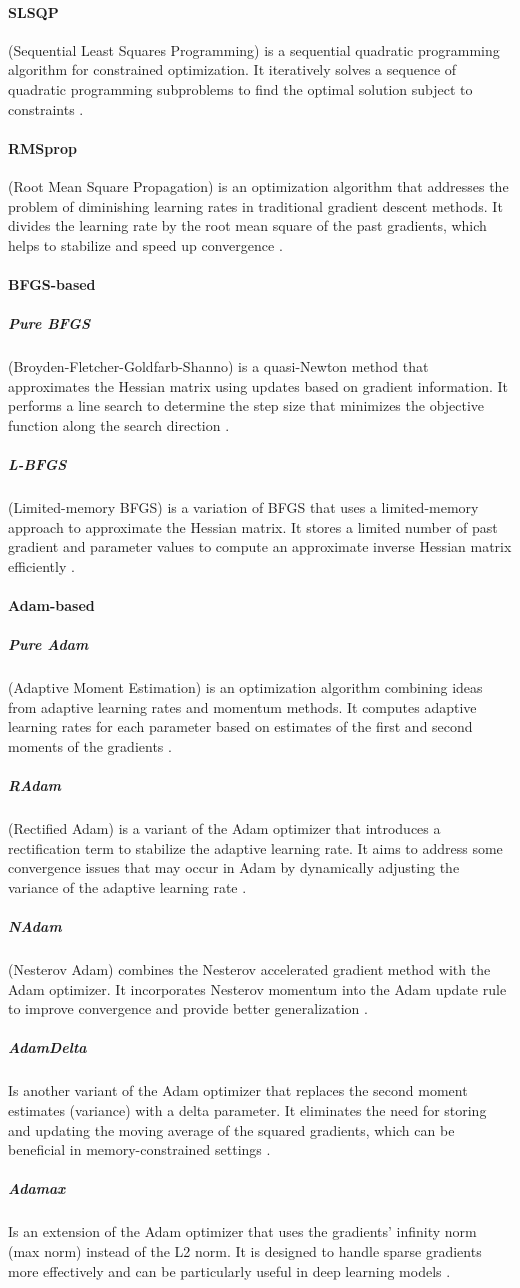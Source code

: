 \paragraph{SLSQP}
(Sequential Least Squares Programming) is a sequential quadratic programming algorithm for constrained optimization.
It iteratively solves a sequence of quadratic programming subproblems to find the optimal solution subject to constraints \cite{Bonnans2006}.
\paragraph{RMSprop}
(Root Mean Square Propagation) is an optimization algorithm that addresses the problem of diminishing learning rates in traditional gradient descent methods.
It divides the learning rate by the root mean square of the past gradients, which helps to stabilize and speed up convergence \cite{Hinton2012}.
\paragraph{BFGS-based}
\subparagraph{Pure BFGS}
(Broyden-Fletcher-Goldfarb-Shanno) is a quasi-Newton method that approximates the Hessian matrix using updates based on gradient information.
It performs a line search to determine the step size that minimizes the objective function along the search direction \cite{Fletcher1987}.
\subparagraph{L-BFGS}
(Limited-memory BFGS) is a variation of BFGS that uses a limited-memory approach to approximate the Hessian matrix.
It stores a limited number of past gradient and parameter values to compute an approximate inverse Hessian matrix efficiently \cite{Liu1989}.
\paragraph{Adam-based}
\subparagraph{Pure Adam}
(Adaptive Moment Estimation) is an optimization algorithm combining ideas from adaptive learning rates and momentum methods.
It computes adaptive learning rates for each parameter based on estimates of the first and second moments of the gradients \cite{Kingma2017}.
\subparagraph{RAdam}
(Rectified Adam) is a variant of the Adam optimizer that introduces a rectification term to stabilize the adaptive learning rate.
It aims to address some convergence issues that may occur in Adam by dynamically adjusting the variance of the adaptive learning rate \cite{Liu2021}.
\subparagraph{NAdam}
(Nesterov Adam) combines the Nesterov accelerated gradient method with the Adam optimizer.
It incorporates Nesterov momentum into the Adam update rule to improve convergence and provide better generalization \cite{Tato2018}.
\subparagraph{AdamDelta}
Is another variant of the Adam optimizer that replaces the second moment estimates (variance) with a delta parameter.
It eliminates the need for storing and updating the moving average of the squared gradients, which can be beneficial in memory-constrained settings \cite{Zeiler2012}.
\subparagraph{Adamax}
Is an extension of the Adam optimizer that uses the gradients' infinity norm (max norm) instead of the L2 norm. It is designed to handle sparse gradients more effectively and can be particularly useful in deep learning models \cite{Bera2020}.
